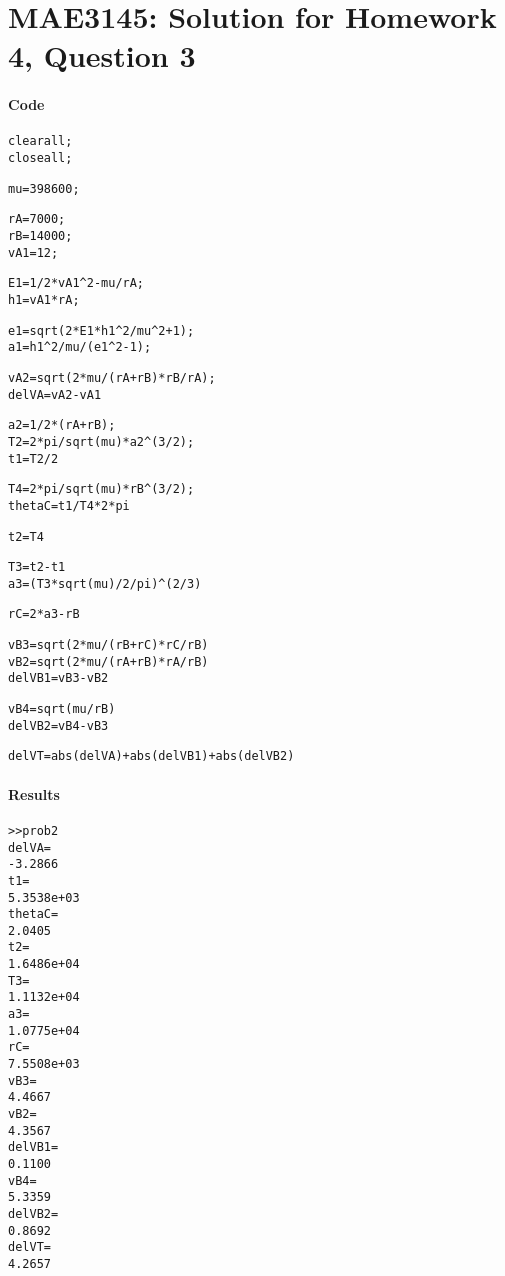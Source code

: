 \documentclass[10pt]{article}
\date{}
\renewcommand{\baselinestretch}{1.2}
\theoremstyle{plain}\theorembodyfont{\normalfont}
\newenvironment{matlab}
{\begin{alltt}\small\renewcommand{\baselinestretch}{1.2}\selectfont}%
{\end{alltt}}
\begin{document}
\pagestyle{empty}
\section*{MAE3145: Solution for Homework 4, Question 3}


\paragraph{Code}
\begin{matlab}
clear all;
close all;

mu=398600;

rA=7000;
rB=14000;
vA1=12;


E1=1/2*vA1^2-mu/rA;
h1=vA1*rA;

e1=sqrt(2*E1*h1^2/mu^2+1);
a1=h1^2/mu/(e1^2-1);

vA2=sqrt(2*mu/(rA+rB)*rB/rA);
delVA=vA2-vA1


a2=1/2*(rA+rB);
T2=2*pi/sqrt(mu)*a2^(3/2);
t1=T2/2


T4=2*pi/sqrt(mu)*rB^(3/2);
thetaC=t1/T4*2*pi

t2=T4

T3=t2-t1
a3=(T3*sqrt(mu)/2/pi)^(2/3)

rC=2*a3-rB


vB3=sqrt(2*mu/(rB+rC)*rC/rB)
vB2=sqrt(2*mu/(rA+rB)*rA/rB)
delVB1=vB3-vB2


vB4=sqrt(mu/rB)
delVB2=vB4-vB3


delVT=abs(delVA)+abs(delVB1)+abs(delVB2)
\end{matlab}

\paragraph{Results}
\begin{matlab}
>> prob2
delVA =
   -3.2866
t1 =
   5.3538e+03
thetaC =
    2.0405
t2 =
   1.6486e+04
T3 =
   1.1132e+04
a3 =
   1.0775e+04
rC =
   7.5508e+03
vB3 =
    4.4667
vB2 =
    4.3567
delVB1 =
    0.1100
vB4 =
    5.3359
delVB2 =
    0.8692
delVT =
    4.2657
\end{matlab}
\end{document}

